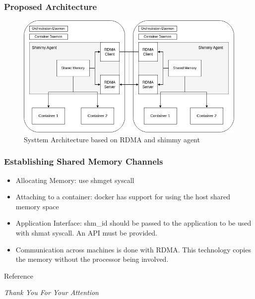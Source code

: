 \documentclass{beamer}
\begin{document}
\begin{frame}
    \frametitle{Proposed Architecture}
    \begin{figure}
        \centering
        \includegraphics[width=1.0\textwidth]{arch.png}
        \caption{Systtem Architecture based on RDMA and shimmy agent}
        \label{fig:arch}
    \end{figure}
\end{frame}

\begin{frame}
    \frametitle{Establishing Shared Memory Channels}
    \begin{itemize}
        \item Allocating Memory: use shmget syscall
        \item Attaching to a container: docker has support for using the
            host shared memory space
        \item Application Interface: shm\_id should be passed to the
            application to be used with shmat syscall. An API must be provided.
        \item Communication across machines is done with RDMA. This technology
            copies the memory without the processor being involved.
    \end{itemize}
\end{frame}

\begin{frame}{Reference}

 
\end{frame}

\begin{frame}
  \centering \Large
  \emph{Thank You For Your Attention}
\end{frame}
\end{document}
